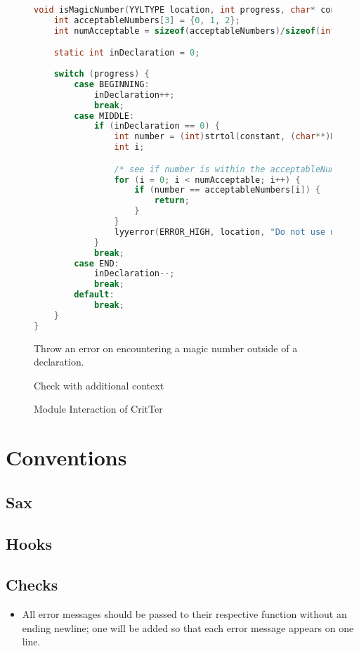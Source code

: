 \documentclass[12pt]{report}
\newcommand{\programName}{CritTer\xspace}
\begin{document}
\begin{figure}
\caption{Check with additional context}
\label{checkWithContext}
\begin{lstlisting}[language=C]
void isMagicNumber(YYLTYPE location, int progress, char* constant) {
	int acceptableNumbers[3] = {0, 1, 2};
	int numAcceptable = sizeof(acceptableNumbers)/sizeof(int);

	static int inDeclaration = 0;
	
	switch (progress) {
		case BEGINNING:
			inDeclaration++;
			break;
		case MIDDLE:
			if (inDeclaration == 0) {
				int number = (int)strtol(constant, (char**)NULL, 0);
				int i;

				/* see if number is within the acceptableNumbers array */
				for (i = 0; i < numAcceptable; i++) {
					if (number == acceptableNumbers[i]) {
						return;
					}
				}
				lyyerror(ERROR_HIGH, location, "Do not use magic numbers");
			}
			break;
		case END:
			inDeclaration--;
			break;
		default:
			break;
	}
}
\end{lstlisting}
\small{Throw an error on encountering a magic number outside of a declaration.}
\end{figure}



\begin{figure}
\caption{Module Interaction of \programName}
\label{moduleInteraction}
\begin{center}
\end{center}
\end{figure}

\chapter{Conventions}

\section{Sax}

\section{Hooks}

\section{Checks}

\begin{itemize}
\item All error messages should be passed to their respective function without an ending newline; one 
will be added so that each error message appears on one line.

\end{itemize}

\nocite{*}

\clearpage
{}
{}

\end{document}

